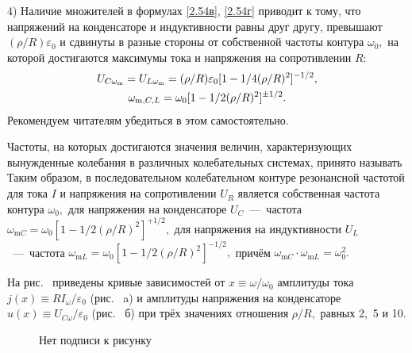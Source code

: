 4) Наличие множителей   в формулах \eqref{2.54в}, \eqref{2.54г} приводит к тому, что  напряжений на конденсаторе и индуктивности равны друг другу, превышают $(\rho/R)\varepsilon_0$ и сдвинуты в разные стороны от собственной частоты контура $\omega_0,$ на которой достигаются максимумы тока и напряжения на сопротивлении $R:$
\begin{equation}
	\eqmark{2.57}
	\begin{gathered}[c]
		U_{C\omega_\text{m}}=U_{L\omega_\text{m}}=(\rho/R)\varepsilon_0[1-1/4(\rho/R)^2]^{-1/2},\\
		\omega_{\text{m},C,L}=\omega_0[1-1/2(\rho/R)^2]^{\pm1/2}.
	\end{gathered}
\end{equation}
Рекомендуем читателям убедиться в этом самостоятельно.

Частоты, на которых достигаются  значения величин, характеризующих вынужденные колебания в различных колебательных системах, принято называть  Таким образом, в последовательном колебательном контуре резонансной частотой для тока $I$ и напряжения на сопротивлении $U_R$ является собственная частота контура $\omega_0,$ для напряжения на конденсаторе $U_C$~---~частота $\omega_{\text{m}C}=\omega_0[1-1/2(\rho/R)^2]^{+1/2},$ для напряжения на индуктивности $U_L$~---~частота $\omega_{\text{m}L}=\omega_0[1-1/2(\rho/R)^2]^{-1/2},$ причём $\omega_{\text{m}C}\cdot\omega_{\text{m}L}=\omega_0^2.$
	
На рис.~ приведены  кривые зависимостей от $x\equiv\omega/\omega_0$ амплитуды тока $j(x)\equiv RI_\omega/\varepsilon_0$ (рис.~ a) и амплитуды напряжения на конденсаторе $u(x)\equiv U_{C\omega}/\varepsilon_0$  (рис.~ б) при трёх значениях отношения $\rho/R,$ равных 2,~5 и 10.
\begin{figure}[h]
		\begin{minipage}[h]{0.45\linewidth}
		\end{minipage}
		\hfill
		\begin{minipage}[h]{0.45\linewidth}
		\end{minipage}
		\caption{Нет подписи к рисунку}
\end{figure}

